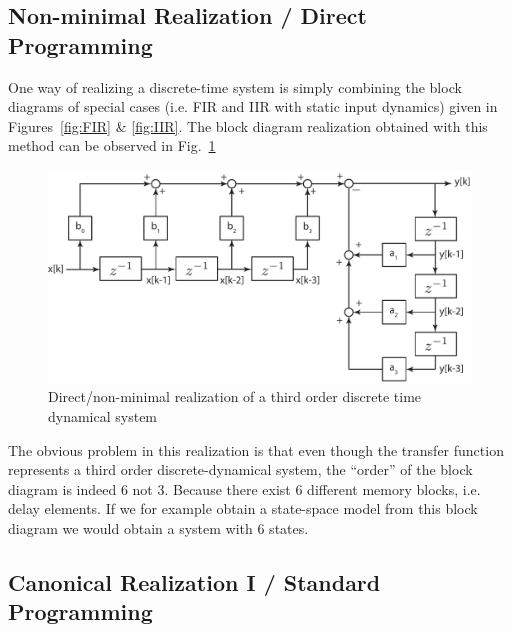 \documentclass[twoside]{article}
\begin{document}
\subsection*{Non-minimal Realization / Direct Programming}

One way of realizing a discrete-time system is simply combining
the block diagrams of special cases (i.e. FIR and IIR with static input
dynamics) given in Figures~\ref{fig:FIR} \& \ref{fig:IIR}. The block
diagram realization obtained with this method can be observed in
Fig.~\ref{fig:direct}
%
\begin{figure}[h]
    \centering
      \includegraphics[width=1\textwidth]{direct}
    \caption{Direct/non-minimal realization of a third order discrete
      time dynamical system}
        \label{fig:direct}
\end{figure}

The obvious problem in this realization is that even though the transfer function
represents a third order discrete-dynamical system, the ``order'' 
of the block diagram is indeed 6 not 3. Because there exist 6
different memory blocks, i.e. delay elements. If we for example
obtain a state-space model from this block diagram we would obtain 
a system with 6 states. 

\newpage

\subsection*{Canonical Realization I / Standard Programming}
\end{document}

